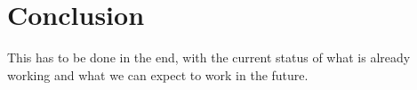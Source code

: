\chapter{Conclusion}
\label{ch:conc}

This has to be done in the end, with the current status of what is already working and what we can expect to work in the future.
